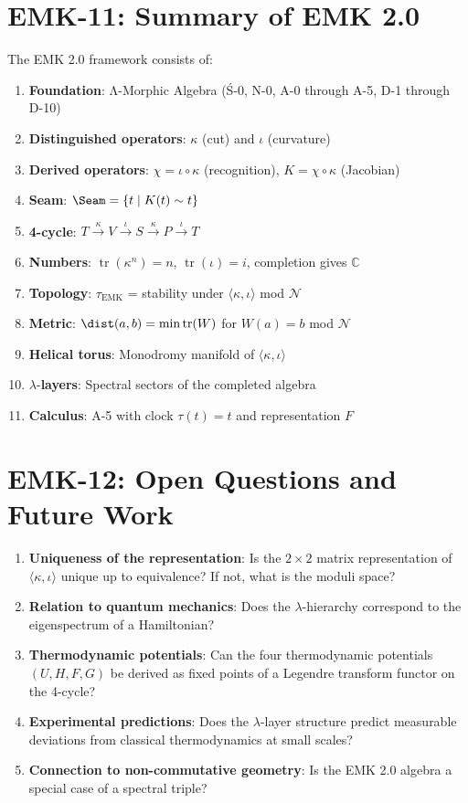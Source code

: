 \documentclass[12pt, oneside]{article}
\DeclareMathOperator{\tr}{tr}
\newcommand{\N}{\mathcal{N}}
\begin{document}
\section{EMK-11: Summary of EMK 2.0}

The EMK 2.0 framework consists of:

\begin{enumerate}
    \item \textbf{Foundation}: Λ-Morphic Algebra (Ś-0, N-0, A-0 through A-5, D-1 through D-10)
    \item \textbf{Distinguished operators}: $\kappa$ (cut) and $\iota$ (curvature)
    \item \textbf{Derived operators}: $\chi = \iota \circ \kappa$ (recognition), $K = \chi \circ \kappa$ (Jacobian)
    \item \textbf{Seam}: $\Seam = \{ t \mid K(t) \sim t \}$
    \item \textbf{4-cycle}: $T \xrightarrow{\kappa} V \xrightarrow{\iota} S \xrightarrow{\kappa} P \xrightarrow{\iota} T$
    \item \textbf{Numbers}: $\tr(\kappa^n) = n$, $\tr(\iota) = i$, completion gives $\mathbb{C}$
    \item \textbf{Topology}: $\tau_{\text{EMK}}$ = stability under $\langle \kappa, \iota \rangle$ mod $\N$
    \item \textbf{Metric}: $\dist(a,b) = \min \tr(W)$ for $W(a)=b$ mod $\N$
    \item \textbf{Helical torus}: Monodromy manifold of $\langle \kappa, \iota \rangle$
    \item $\lambda$-\textbf{layers}: Spectral sectors of the completed algebra
    \item \textbf{Calculus}: A-5 with clock $\tau(t)=t$ and representation $F$
\end{enumerate}

\section{EMK-12: Open Questions and Future Work}

\begin{enumerate}
    \item \textbf{Uniqueness of the representation}: Is the $2\times 2$ matrix representation of $\langle \kappa, \iota \rangle$ unique up to equivalence? If not, what is the moduli space?
    \item \textbf{Relation to quantum mechanics}: Does the $\lambda$-hierarchy correspond to the eigenspectrum of a Hamiltonian?
    \item \textbf{Thermodynamic potentials}: Can the four thermodynamic potentials $(U, H, F, G)$ be derived as fixed points of a Legendre transform functor on the 4-cycle?
    \item \textbf{Experimental predictions}: Does the $\lambda$-layer structure predict measurable deviations from classical thermodynamics at small scales?
    \item \textbf{Connection to non-commutative geometry}: Is the EMK 2.0 algebra a special case of a spectral triple?
\end{enumerate}
\end{document}
